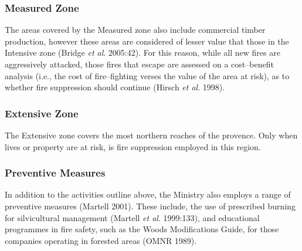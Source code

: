 \begin{spacing}{1.5}
\subsubsection{Measured Zone}
The areas covered by the Measured zone also include commercial timber production, however these areas are considered of lesser value that those in the Intensive zone (Bridge \emph{et al}. 2005:42). For this reason, while all new fires are aggressively attacked, those fires that escape are assessed on a cost--benefit analysis (i.e., the cost of fire--fighting verses the value of the area at risk), as to whether fire suppression should continue (Hirsch \emph{et al}. 1998).

\subsubsection{Extensive Zone}
The Extensive zone covers the most northern reaches of the provence. Only when lives or property are at risk, is fire suppression employed in this region.

\subsubsection{Preventive Measures}
\noindent In addition to the activities outline above, the Ministry also employs a range of preventive measures (Martell 2001). These include, the use of prescribed burning for silvicultural management (Martell \emph{et al}. 1999:133), and educational programmes in fire safety, such as the Woods Modifications Guide, for those companies operating in forested areas (OMNR 1989).


\end{spacing}
\clearpage
